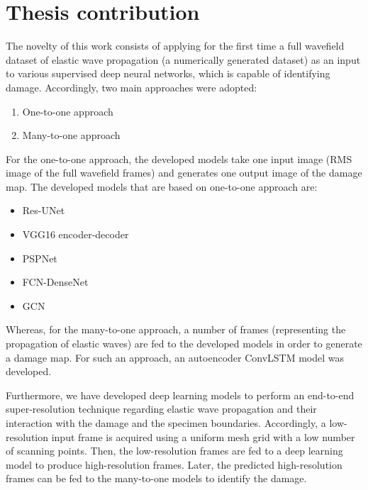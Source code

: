\section{Thesis contribution}
\label{sec14}
The novelty of this work consists of applying for the first time a full wavefield dataset of elastic wave propagation (a numerically generated dataset) as an input to various supervised deep neural networks, which is capable of identifying damage.
Accordingly, two main approaches were adopted:
\begin{enumerate}
	\item One-to-one approach
	\item Many-to-one approach
\end{enumerate}

For the one-to-one approach, the developed models take one input image (RMS image of the full wavefield frames) and generates one output image of the damage map. 
The developed models that are based on one-to-one approach are:
\begin{itemize}
	\item Res-UNet
	\item VGG16 encoder-decoder
	\item PSPNet
	\item FCN-DenseNet
	\item GCN
\end{itemize}
Whereas, for the many-to-one approach, a number of frames (representing the propagation of elastic waves) are fed to the developed models in order to generate a damage map.
For such an approach, an autoencoder ConvLSTM model was developed.

Furthermore, we have developed deep learning models to perform an end-to-end super-resolution technique regarding elastic wave propagation and their interaction with the damage and the specimen boundaries.
Accordingly, a low-resolution input frame is acquired using a uniform mesh grid with a low number of scanning points.
Then, the low-resolution frames are fed to a deep learning model to produce high-resolution frames.
Later, the predicted high-resolution frames can be fed to the many-to-one models to identify the damage.